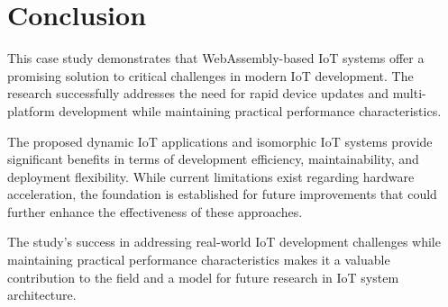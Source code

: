 \documentclass[11pt]{article}
\begin{document}
\section{Conclusion}

This case study demonstrates that WebAssembly-based IoT systems offer a promising solution to critical challenges in modern IoT development. The research successfully addresses the need for rapid device updates and multi-platform development while maintaining practical performance characteristics.

The proposed dynamic IoT applications and isomorphic IoT systems provide significant benefits in terms of development efficiency, maintainability, and deployment flexibility. While current limitations exist regarding hardware acceleration, the foundation is established for future improvements that could further enhance the effectiveness of these approaches.

The study's success in addressing real-world IoT development challenges while maintaining practical performance characteristics makes it a valuable contribution to the field and a model for future research in IoT system architecture.



\end{document}
